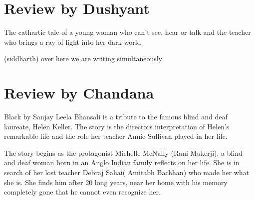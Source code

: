 \documentclass{article}
\begin{document}
\section{Review by Dushyant}
The cathartic tale of a young woman who can't see, hear or talk and the teacher who brings a ray of light into her dark world.

(siddharth) over here we are writing simultaneously

\section{Review by Chandana}
Black by Sanjay Leela Bhansali is a tribute to the famous blind and deaf laureate, Helen Keller. The story is the directors interpretation of Helen's remarkable life and the role her teacher Annie Sullivan played in her life.
\par
The story begins as the protagonist Michelle McNally (Rani Mukerji), a blind and deaf woman born in an Anglo Indian family reflects on her life. She is in search of her lost teacher Debraj Sahai( Amitabh Bachhan) who made her what she is. She finds him after 20 long years, near her home with his memory completely gone that he cannot even recognize her.
\end{document}
